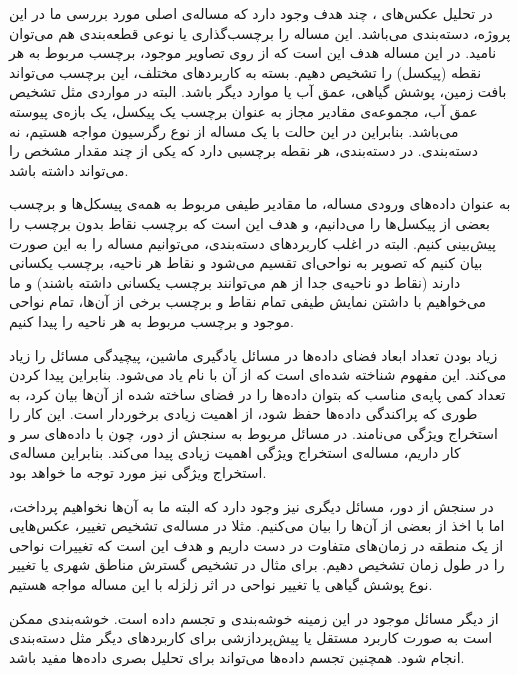 \documentclass[11pt]{article}
\begin{document}
در تحلیل عکس‌های \hyperspec{}، چند هدف وجود دارد که مساله‌ی اصلی مورد بررسی ما در این پروژه، دسته‌بندی
می‌باشد. این مساله را برچسب‌گذاری یا نوعی قطعه‌بندی هم می‌توان نامید. در این مساله هدف این است که از روی تصاویر موجود، برچسب مربوط به هر نقطه (پیکسل) را تشخیص دهیم. بسته به کاربردهای مختلف، این برچسب می‌تواند بافت زمین، پوشش گیاهی، عمق آب یا موارد دیگر باشد. البته در مواردی مثل تشخیص عمق آب، مجموعه‌ی مقادیر مجاز به عنوان برچسب یک پیکسل، یک بازه‌ی پیوسته‌ می‌باشد. بنابراین در این حالت با یک مساله از نوع رگرسیون مواجه هستیم، نه دسته‌بندی. در دسته‌بندی، هر نقطه برچسبی دارد که یکی از چند مقدار مشخص را می‌تواند داشته باشد.

به عنوان داده‌های ورودی مساله، ما مقادیر طیفی مربوط به همه‌ی پیسکل‌ها و برچسب بعضی از پیکسل‌ها را می‌دانیم، و هدف این است که برچسب نقاط بدون برچسب را پیش‌بینی کنیم. البته در اغلب کاربردهای دسته‌بندی، می‌توانیم مساله را به این صورت بیان کنیم که تصویر به نواحی‌ای تقسیم می‌شود و نقاط هر ناحیه، برچسب یکسانی دارند (نقاط دو ناحیه‌ی جدا از هم می‌توانند برچسب یکسانی داشته باشند) و ما می‌خواهیم با داشتن نمایش طیفی تمام نقاط و برچسب برخی از آن‌ها، تمام نواحی موجود و برچسب مربوط به هر ناحیه را پیدا کنیم.


زیاد بودن تعداد ابعاد فضای داده‌ها در مسائل یادگیری ماشین، پیچیدگی مسائل را زیاد می‌کند. این مفهوم شناخته شده‌ای است که از آن با نام \curseOfDim{}
یاد می‌شود. بنابراین پیدا کردن تعداد کمی پایه‌ی مناسب که بتوان داده‌ها را در فضای ساخته شده از آن‌ها بیان کرد، به طوری که پراکندگی داده‌ها حفظ شود، از اهمیت زیادی برخوردار است. این کار را استخراج ویژگی می‌نامند. در مسائل مربوط به سنجش از دور، چون با داده‌های \hyperspec{} سر و کار داریم، مساله‌ی استخراج ویژگی اهمیت زیادی پیدا می‌کند. بنابراین مساله‌ی استخراج ویژگی نیز مورد توجه ما خواهد بود.


در سنجش از دور، مسائل دیگری نیز وجود دارد که البته ما به آن‌ها نخواهیم پرداخت، اما با اخذ از 
\cite{ML_in_RS}
بعضی از آن‌ها را بیان می‌کنیم. مثلا در مساله‌ی تشخیص تغییر،
 عکس‌هایی از یک منطقه در زمان‌های متفاوت در دست داریم و هدف این است که تغییرات نواحی را در طول زمان تشخیص دهیم. برای مثال در تشخیص گسترش مناطق شهری یا تغییر نوع پوشش گیاهی یا تغییر نواحی در اثر زلزله با این مساله مواجه هستیم.
 
 
از دیگر مسائل موجود در این زمینه خوشه‌بندی
و تجسم داده
است. خوشه‌بندی ممکن است به صورت کاربرد مستقل یا پیش‌پردازشی برای کاربردهای دیگر مثل دسته‌بندی انجام شود. همچنین تجسم داده‌ها می‌تواند برای تحلیل بصری داده‌ها مفید باشد.
\end{document}
